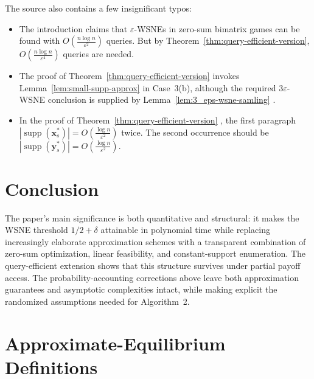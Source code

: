 The source also contains a few insignificant typos:
\begin{itemize}
  \item The introduction claims that $\varepsilon$-WSNEs in zero-sum bimatrix games can be found with $O\left(\frac{n \log n}{\varepsilon^2}\right)$ queries. But by Theorem~\ref{thm:query-efficient-version}, $O\left(\frac{n \log n}{\varepsilon^4}\right)$ queries are needed.
  \item The proof of Theorem~\ref{thm:query-efficient-version} \cite[proof of Theorem~2]{12WSNE} invokes Lemma~\ref{lem:small-supp-approx} \cite[Lemma~1]{12WSNE} in Case~3(b), although the required $3\varepsilon$-WSNE conclusion is supplied by Lemma~\ref{lem:3_eps-wsne-samling} \cite[Lemma~2]{12WSNE}.
  \item In the proof of Theorem~\ref{thm:query-efficient-version} \cite[proof of Theorem~2]{12WSNE}, the first paragraph $|\operatorname{supp}(\mathbf{x}_s^*)| = O\left(\frac{\log n}{\varepsilon^2}\right)$ twice. The second occurrence should be $|\operatorname{supp}(\mathbf{y}_s^*)| = O\left(\frac{\log n}{\varepsilon^2}\right)$.
\end{itemize}

\section{Conclusion}

The paper's main significance is both quantitative and structural: it makes the WSNE threshold $1/2+\delta$ attainable in polynomial time while replacing increasingly elaborate approximation schemes with a transparent combination of zero-sum optimization, linear feasibility, and constant-support enumeration. The query-efficient extension shows that this structure survives under partial payoff access. The probability-accounting corrections above leave both approximation guarantees and asymptotic complexities intact, while making explicit the randomized assumptions needed for Algorithm~2.

\clearpage
\appendix

\section{Approximate-Equilibrium Definitions}
\label{app:equilibrium-definitions}

